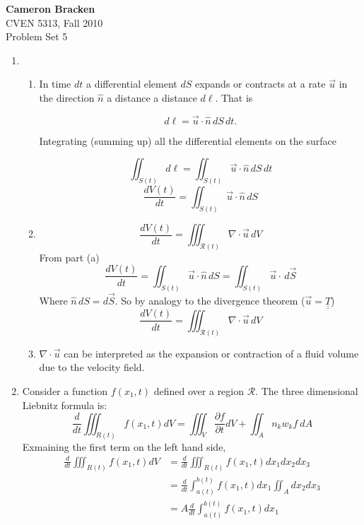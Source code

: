 \documentclass[11pt,twoside]{article}
\newcommand{\p}[2]{\frac{\partial#1}{\partial#2}}
\newcommand{\vect}[1]{\vec{#1}}
\newcommand{\grad}{\nabla}
\newcommand{\tensor}[1]{\underline{\underline{#1}}}
\begin{document}
\thispagestyle{empty}
\noindent\textbf{Cameron Bracken}\\
CVEN 5313, Fall 2010\\
Problem Set 5


\begin{enumerate}

%
%
\item 
\begin{enumerate}

\item In time $dt$ a differential element $dS$ expands or contracts at a rate $\vect{u}$ in the direction $\hat{n}$ a distance a distance $d\ell$. That is 

$$d\ell=\vect{u}\cdot\hat{n}\,dS\,dt.$$

Integrating (summing up) all the differential elements on the surface 

$$\iint_{S(t)}d\ell=\iint_{S(t)}\vect{u}\cdot\hat{n}\,dS\,dt$$
$$\frac{dV(t)}{dt}=\iint_{S(t)}\vect{u}\cdot\hat{n}\,dS$$

\item 
$$\frac{dV(t)}{dt} = \iiint_{\mathcal{R}(t)}\grad\cdot\vect{u}\,dV$$
From part (a)
$$\frac{dV(t)}{dt} = \iint_{S(t)}\vect{u}\cdot\hat{n}\,dS = \iint_{S(t)}\vect{u}\cdot\,d\vect{S}$$
Where $\hat{n}\,dS=d\vect{S}$. So by analogy to the divergence theorem ($\vect{u}=\tensor{T}$)
$$\frac{dV(t)}{dt} = \iiint_{\mathcal{R}(t)}\grad\cdot\vect{u}\,dV$$

\item $\grad\cdot\vect{u}$ can be interpreted as the expansion or contraction of a fluid volume due to the velocity field. 
\end{enumerate}

%
%

\item 
Consider a function $f(x_1,t)$ defined over a region $\mathcal{R}$.  The three dimensional Liebnitz formula is: 
\begin{equation}
\frac{d}{dt}\iiint_{R(t)}f(x_1,t)dV = \iiint_V \p{f}{t} dV + \iint_A n_k w_k f\: dA\label{lieb}
\end{equation}
Exmaining the first term on the left hand side, 
\begin{align}
\frac{d}{dt}\iiint_{R(t)}f(x_1,t)dV &= \frac{d}{dt}\iiint_{R(t)}f(x_1,t)dx_1dx_2dx_3\nonumber\\
                                    &= \frac{d}{dt}\int_{a(t)}^{b(t)}f(x_1,t)dx_1\iint_Adx_2dx_3\nonumber\\
                                    &= A\frac{d}{dt}\int_{a(t)}^{b(t)}f(x_1,t)dx_1\label{lhs}
\end{align}


\end{enumerate}
\end{document}
